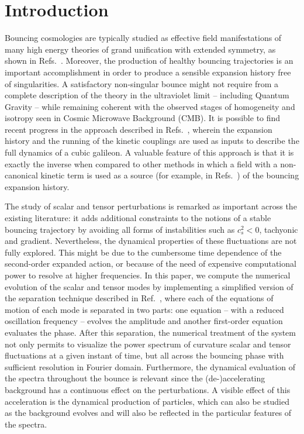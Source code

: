 \documentclass[aps,prd,reprint,twocolumn,showpacs,nofootinbib,superscriptaddress,floatfix]{revtex4-1}
\begin{document}
\section{Introduction}
Bouncing cosmologies are typically studied as effective field manifestations of many high energy theories of grand unification with extended symmetry, as shown in Refs.~\cite{Ashtekar:2006rx, Poplawski:2011jz}. Moreover, the production of healthy bouncing trajectories is an important accomplishment in order to produce a sensible expansion history free of singularities. A satisfactory non-singular bounce might not require from a complete description of the theory in the ultraviolet limit -- including Quantum Gravity -- while remaining coherent with the observed stages of homogeneity and isotropy seen in Cosmic Microwave Background (CMB). It is possible to find recent progress in the approach described in Refs.~\cite{Ijjas:2016tpn, Ijjas:2016vtq}, wherein the expansion history and the running of the kinetic couplings are used as inputs to describe the full dynamics of a cubic galileon. A valuable feature of this approach is that it is exactly the inverse when compared to other methods in which a field with a non-canonical kinetic term is used as a source (for example, in Refs.~\cite{Deffayet:2010qz, Easson:2011zy}) of the bouncing expansion history.  

The study of scalar and tensor perturbations is remarked as important across the existing literature: it adds additional constraints to the notions of a stable bouncing trajectory by avoiding all forms of instabilities such as $c_s^2<0$, tachyonic and gradient. Nevertheless, the dynamical properties of these fluctuations are not fully explored. This might be due to the cumbersome time dependence of the second-order expanded action, or because of the need of expensive computational power to resolve at higher frequencies. In this paper, we compute the numerical evolution of the scalar and tensor modes by implementing a simplified version of the separation technique described in Ref.~\cite{Ghersi:2016gee}, where each of the equations of motion of each mode is separated in two parts: one equation -- with a reduced oscillation frequency -- evolves the amplitude and another first-order equation evaluates the phase. After this separation, the numerical treatment of the system not only permits to visualize the power spectrum of curvature scalar and tensor fluctuations at a given instant of time, but all across the bouncing phase with sufficient resolution in Fourier domain. Furthermore, the dynamical evaluation of the spectra throughout the bounce is relevant since the (de-)accelerating background has a continuous effect on the perturbations. A visible effect of this acceleration is the dynamical production of particles, which can also be studied as the background evolves and will also be reflected in the particular features of the spectra.              
\end{document}
